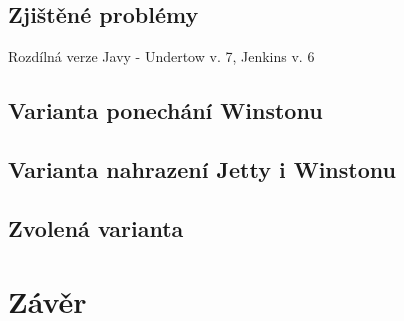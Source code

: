     \subsection{Zjištěné problémy}
        Rozdílná verze Javy - Undertow v. 7, Jenkins v. 6
        
        
    \subsection{Varianta ponechání Winstonu}

    \subsection{Varianta nahrazení Jetty i Winstonu}

    \subsection{Zvolená varianta}



\section{Závěr}





